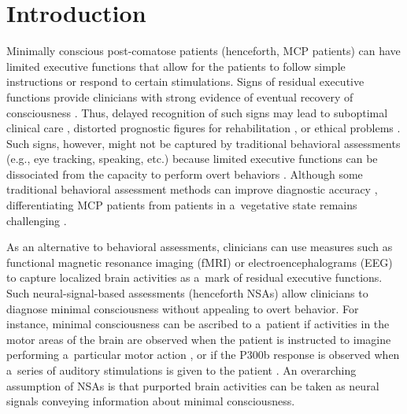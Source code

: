 \section{Introduction}
Minimally conscious post-comatose patients (henceforth, MCP patients) can have limited executive functions that allow for the patients to follow simple instructions or respond to certain stimulations. Signs of residual executive functions provide clinicians with strong evidence of eventual recovery of consciousness
\parencites[][]{naccache_minimally_2018}[][]{rohaut_uncovering_2019}. %
 Thus, delayed recognition of such signs may lead to suboptimal clinical care 
\parencite[van][]{van_erp_unexpected_2019}, %
 distorted prognostic figures for rehabilitation 
\parencite[][]{ansell_slow--recover_1993}, %
 or ethical problems 
\parencites[][]{peterson_post-comatose_2018}[][]{noh_behavioral_2022}. %
 Such signs, however, might not be captured by traditional behavioral assessments (e.g., eye tracking, speaking, etc.) because limited executive functions can be dissociated from the capacity to perform overt behaviors 
\parencites[][]{teasdale_assessment_1974}[][]{andrews_misdiagnosis_1996}. %
 Although some traditional behavioral assessment methods can improve diagnostic accuracy 
\parencite[][]{schnakers_diagnostic_2009}, %
 differentiating MCP patients from patients in a~vegetative state remains challenging 
\parencite[van][]{van_erp_vegetative_2015}.%


As an alternative to behavioral assessments, clinicians can use measures such as functional magnetic resonance imaging (fMRI) or electroencephalograms (EEG) to capture localized brain activities as a~mark of residual executive functions. Such neural-signal-based assessments (henceforth NSAs) allow clinicians to diagnose minimal consciousness without appealing to overt behavior. For instance, minimal consciousness can be ascribed to a~patient if activities in the motor areas of the brain are observed when the patient is instructed to imagine performing a~particular motor action
\parencites[][]{owen_detecting_2006}[][]{cruse_bedside_2011}[][]{wang_detecting_2019}, %
 or if the P300b response is observed when a~series of auditory stimulations is given to the patient 
\parencites[][]{boly_preserved_2011}[][]{king_single-trial_2013}. %
 An overarching assumption of NSAs is that purported brain activities can be taken as neural signals conveying information about minimal consciousness.

